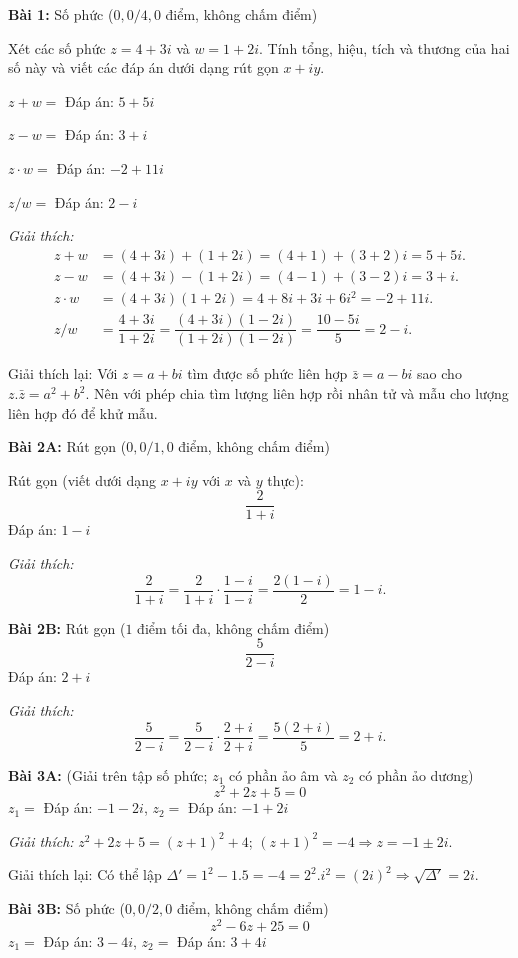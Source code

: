 \documentclass[12pt,a4paper]{article}
\begin{document}
\textbf{Bài 1:} Số phức ($0{,}0/4{,}0$ điểm, không chấm điểm)

Xét các số phức $z = 4 + 3i$ và $w = 1 + 2i$.
Tính tổng, hiệu, tích và thương của hai số này và viết các đáp án dưới dạng rút gọn $x + iy$.

$z + w = $ Đáp án: $5+5i$

$z - w = $ Đáp án: $3+i$

$z \cdot w = $ Đáp án: $-2+11i$

$z/w = $ Đáp án: $2-i$

\textit{Giải thích:}
\begin{align*}
z + w &= (4+3i) + (1+2i) = (4+1) + (3+2)i = 5 + 5i.\\
z - w &= (4+3i) - (1+2i) = (4-1) + (3-2)i = 3 + i.\\
z \cdot w &= (4+3i)(1+2i) = 4 + 8i + 3i + 6i^2 = -2 + 11i.\\
z/w &= \dfrac{4+3i}{1+2i} = \dfrac{(4+3i)(1-2i)}{(1+2i)(1-2i)} = \dfrac{10 - 5i}{5} = 2-i.
\end{align*}

Giải thích lại: Với $z = a + bi$ tìm được số phức liên hợp $\bar z = a - bi$ sao cho $z.\bar z = a^2 + b^2$. Nên với phép chia tìm lượng liên hợp rồi nhân tử và mẫu cho lượng liên hợp đó để khử mẫu.

\textbf{Bài 2A:} Rút gọn ($0{,}0/1{,}0$ điểm, không chấm điểm)

Rút gọn (viết dưới dạng $x+iy$ với $x$ và $y$ thực):
\[
\dfrac{2}{1+i}
\]
Đáp án: $1-i$

\textit{Giải thích:}
\[
\dfrac{2}{1+i} = \dfrac{2}{1+i} \cdot \dfrac{1-i}{1-i} = \dfrac{2(1-i)}{2} = 1-i.
\]

\textbf{Bài 2B:} Rút gọn ($1$ điểm tối đa, không chấm điểm)
\[
\dfrac{5}{2-i}
\]
Đáp án: $2+i$

\textit{Giải thích:}
\[
\dfrac{5}{2-i} = \dfrac{5}{2-i} \cdot \dfrac{2+i}{2+i} = \dfrac{5(2+i)}{5} = 2+i.
\]

\textbf{Bài 3A:} (Giải trên tập số phức; $z_1$ có phần ảo âm và $z_2$ có phần ảo dương)
\[
z^2 + 2z + 5 = 0
\]
$z_1 = $ Đáp án: $-1-2i$, \quad $z_2 = $ Đáp án: $-1+2i$

\textit{Giải thích:}
$z^2 + 2z + 5 = (z+1)^2 + 4$; \quad $(z+1)^2 = -4 \Rightarrow z = -1 \pm 2i$.

Giải thích lại: Có thể lập $\Delta' = 1^2 - 1.5 = -4 = 2^2.i^2 = (2i)^2 \Rightarrow \sqrt{\Delta'} = 2i$.

\textbf{Bài 3B:} Số phức ($0{,}0/2{,}0$ điểm, không chấm điểm)
\[
z^2 - 6z + 25 = 0
\]
$z_1 = $ Đáp án: $3-4i$, \quad $z_2 = $ Đáp án: $3+4i$
\end{document}
